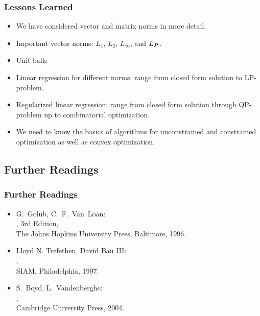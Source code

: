\begin{frame}
  \frametitle{Lessons Learned}

  \begin{itemize}
    \item We have considered vector and matrix norms in more detail. \\[.3cm]
    \item Important vector norms: $L_1$, $L_2$, $L_\infty$, and $L_{{\bm P}}$. \\[.3cm]
    \item Unit balls \\[.3cm] \pause
    \item Linear regression for different norms: range from closed form solution to LP-problem. \\[.3cm]
    \item Regularized linear regression: range from closed form solution through QP-problem up to combinatorial optimization. \\[.3cm]
    \item We need to know the basics of algorithms for unconstrained and constrained optimization as well as convex optimization.
  \end{itemize}
\end{frame}



\subsection{Further Readings}

\begin{frame}
  \frametitle{Further Readings}

  \begin{itemize}
    \item G.~Golub, C.~F.~Van~Loan: \\
      , 3rd Edition, \\
      The Johns Hopkins University Press, Baltimore, 1996. \\[.15cm]
    \item Lloyd N. Trefethen, David Bau III: \\
      , \\
      SIAM, Philadelphia, 1997. \\[0.15cm]
    \item S.~Boyd, L.~Vandenberghe: \\
      , \\
      Cambridge University Press, 2004. \\
       \\
  \end{itemize}
\end{frame}


